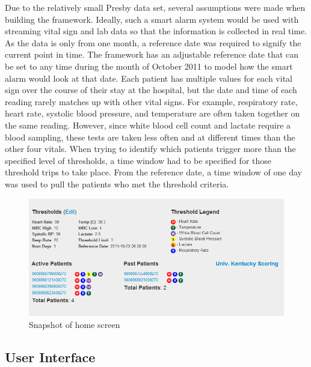 \documentclass{sig-alternate}
\begin{document}
Due to the relatively small Presby data set, several assumptions were made when building the framework.  Ideally, such a smart alarm system would be used with streaming vital sign and lab data so that the information is collected in real time.  As the data is only from one month, a reference date was required to signify the current point in time.  The framework has an adjustable reference date that can be set to any time during the month of October 2011 to model how the smart alarm would look at that date.  Each patient has multiple values for each vital sign over the course of their stay at the hospital, but the date and time of each reading rarely matches up with other vital signs.  For example, respiratory rate, heart rate, systolic blood pressure, and temperature are often taken together on the same reading.  However, since white blood cell count and lactate require a blood sampling, these tests are taken less often and at different times than the other four vitals.  When trying to identify which patients trigger more than the specified level of thresholds, a time window had to be specified for those threshold trips to take place.  From the reference date, a time window of one day was used to pull the patients who met the threshold criteria.  

\begin{figure}
	\begin{center}
		\includegraphics[width=1.0\linewidth]{MainScreen.png}
	\end{center}
	\caption{Snapshot of home screen}
	\label{fig:home}
\end{figure}

\vspace{10pt}
\subsection{User Interface}
\label{subsec:ui}
\vspace{10pt}
\end{document}
